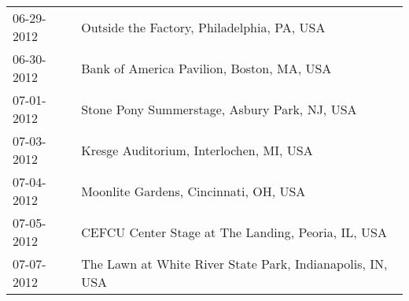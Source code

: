 \begin{supertabular}{ll}
 06-29-2012 &                 Outside the Factory, Philadelphia, PA, USA \\
 06-30-2012 &                  Bank of America Pavilion, Boston, MA, USA \\
 07-01-2012 &               Stone Pony Summerstage, Asbury Park, NJ, USA \\
 07-03-2012 &                    Kresge Auditorium, Interlochen, MI, USA \\
 07-04-2012 &                      Moonlite Gardens, Cincinnati, OH, USA \\
 07-05-2012 &         CEFCU Center Stage at The Landing, Peoria, IL, USA \\
 07-07-2012 &  The Lawn at White River State Park, Indianapolis, IN, USA \\
\end{supertabular}
